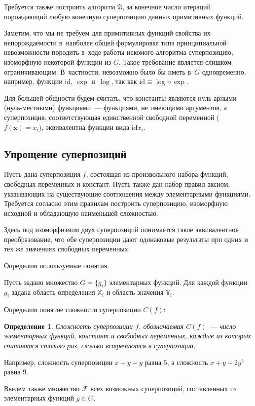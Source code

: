 \documentclass[12pt,a4paper]{article}
\newtheorem{defin}{Определение}
\begin{document}
Требуется также построить алгоритм $\mathfrak{A}$, за конечное число итераций
порождающий любую конечную суперпозицию данных примитивных функций.

Заметим, что мы не требуем для примитивных функций свойства их непорождаемости
в~наиболее общей формулировке типа принципиальной невозможности породить
в~ходе работы искомого алгоритма суперпозицию, изоморфную некоторой функции из
$G$. Такое требование является слишком ограничивающим. В~частности, невозможно
было бы иметь в~$G$ одновременно, например, функции $\text{id}$, $\exp$
и~$\log$, так как $\text{id} \equiv \log \circ \exp$.

Для большей общности будем считать, что константы являются
нуль-арными (нуль-местными) функциями~--- функциями, не имеющими
аргументов, а суперпозиция, соответствующая единственной свободной переменной
($f(\mathbf{x}) = x_i$), эквивалентна функции вида $\text{id} x_i$.

\subsection{Упрощение суперпозиций}

Пусть дана суперпозиция $f$, состоящая из произвольного набора
функций, свободных переменных и констант. Пусть также дан набор
правил-аксиом, указывающих на существующие соотношения между элементарными
функциями. Требуется согласно этим правилам построить суперпозицию, изоморфную
исходной и обладающую наименьшей сложностью.

Здесь под изоморфизмом двух суперпозиций понимается такое эквивалентное
преобразование, что обе суперпозиции дают одинаковые результаты при одних и тех
же значениях свободных переменных.

Определим используемые понятия.

Пусть задано множество $G = \{ g_i \}$ элементарных функций. Для каждой функции
$g_i$ задана область определения $\mathbb{X}_i$ и область значения
$\mathbb{Y}_i$. 

Определим понятие сложности суперпозиции $C(f)$:
\begin{defin}
  \label{def:complexity}
  Сложность суперпозиции $f$, обозначаемая $C(f)$~--- число элементарных функций, констант и
  свободных переменных, каждые из которых считаются столько раз, сколько
  встречаются в суперпозиции.
\end{defin}
Например, сложность суперпозиции $x+y+y$ равна $5$, а сложность $x + y + 2y^3$ равна $9$.

Введем также множество $\mathcal{F}$ всех возможных суперпозиций, составленных из
элементарных функций $g \in G$.
\end{document}
